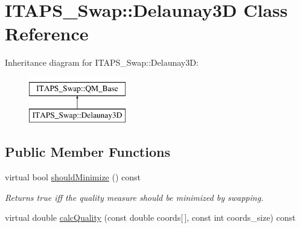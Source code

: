 \hypertarget{class_i_t_a_p_s___swap_1_1_delaunay3_d}{
\section{ITAPS\_\-Swap::Delaunay3D Class Reference}
\label{class_i_t_a_p_s___swap_1_1_delaunay3_d}
}
Inheritance diagram for ITAPS\_\-Swap::Delaunay3D:\begin{figure}[H]
\begin{center}
\leavevmode
\includegraphics[height=2cm]{class_i_t_a_p_s___swap_1_1_delaunay3_d}
\end{center}
\end{figure}
\subsection*{Public Member Functions}
\begin{DoxyCompactItemize}
\item 
\hypertarget{class_i_t_a_p_s___swap_1_1_delaunay3_d_aa1017e73711b3cd8f3a04d64572eff43}{
virtual bool \hyperlink{class_i_t_a_p_s___swap_1_1_delaunay3_d_aa1017e73711b3cd8f3a04d64572eff43}{shouldMinimize} () const }
\label{class_i_t_a_p_s___swap_1_1_delaunay3_d_aa1017e73711b3cd8f3a04d64572eff43}

\begin{DoxyCompactList}\small\item\em Returns true iff the quality measure should be minimized by swapping. \item\end{DoxyCompactList}\item 
virtual double \hyperlink{class_i_t_a_p_s___swap_1_1_delaunay3_d_a5d045c523425ea05cdc4df77a4df61ce}{calcQuality} (const double coords\mbox{[}$\,$\mbox{]}, const int coords\_\-size) const 
\end{DoxyCompactItemize}


